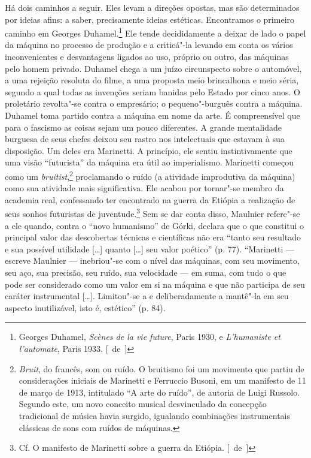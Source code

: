 Há dois caminhos a seguir. Eles levam a direções opostas, mas são
determinados por ideias afins: a saber, precisamente ideias estéticas.
Encontramos o primeiro caminho em Georges Duhamel.\footnote{Georges
  Duhamel, \emph{Scènes de la vie future}, Paris 1930, e
  \emph{L'humaniste et l'automate}, Paris 1933. [~de~]} Ele tende
decididamente a deixar de lado o papel da máquina no processo de
produção e a criticá"-la levando em conta os vários inconvenientes e
desvantagens ligados ao uso, próprio ou outro, das máquinas pelo
homem privado. Duhamel chega a um juízo circunspecto sobre o automóvel,
a uma rejeição resoluta do filme, a uma proposta meio brincalhona e meio séria, segundo a qual todas as invenções seriam banidas pelo
Estado por cinco anos. O proletário revolta"-se contra o empresário; o
pequeno"-burguês contra a máquina. Duhamel toma partido contra a máquina
em nome da arte. É compreensível que para o fascismo as coisas sejam um
pouco diferentes. A grande mentalidade burguesa de seus chefes
deixou seu rastro nos intelectuais que estavam à sua disposição. Um
deles era Marinetti. A princípio, ele sentiu instintivamente que uma
visão ``futurista'' da máquina era útil ao imperialismo. Marinetti começou
como um \emph{bruitist},\footnote{\emph{Bruit}, do francês, som ou
  ruído. O bruitismo foi um movimento que partiu de considerações
  iniciais de Marinetti e Ferruccio Busoni, em um manifesto de 11 de
  março de 1913, intitulado ``A arte do ruído'', de autoria de Luigi
  Russolo. Segundo este, um novo conceito musical desvinculado da
  concepção tradicional de música havia surgido, igualando combinações
  instrumentais clássicas de sons com ruídos de máquinas. \versal{[N.~O.]}} proclamando
o ruído (a atividade improdutiva da máquina) como sua atividade mais
significativa. Ele acabou por tornar"-se membro da academia real,
confessando ter encontrado na guerra da Etiópia a realização de seus
sonhos futuristas de juventude.\footnote{Cf. O manifesto de
  Marinetti sobre a guerra da Etiópia. [~de~]} Sem se dar conta disso,
Maulnier refere"-se a ele quando, contra o ``novo humanismo'' de Górki,
declara que o que constitui o principal valor das descobertas técnicas e
científicas não era ``tanto seu resultado e sua possível utilidade
{[}\ldots{}{]} quanto {[}\ldots{}{]} seu valor poético'' (p. 77). ``Marinetti ---
escreve Maulnier --- inebriou"-se com o nível das máquinas, com seu
movimento, seu aço, sua precisão, seu ruído, sua velocidade --- em suma,
com tudo o que pode ser considerado como um valor em si na máquina e que
não participa de seu caráter instrumental {[}\ldots{}{]}. Limitou"-se a e
deliberadamente a mantê"-la em seu aspecto inutilizável, isto é, estético''
(p. 84).

